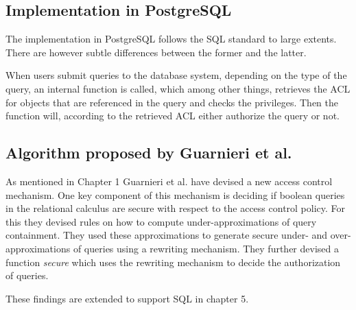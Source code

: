 \subsection{Implementation in PostgreSQL}

The implementation in PostgreSQL follows the SQL standard to large extents. 
%
There are however subtle differences between the former and the latter.
%

When users submit queries to the database system, depending on the type of the query, an internal function is called, which among other things, retrieves the ACL for objects that are referenced in the query and checks the privileges.
%
Then the function will, according to the retrieved ACL either authorize the query or not.

\subsection{Algorithm proposed by Guarnieri et al.}

As mentioned in Chapter 1 Guarnieri et al. have devised a new access control mechanism.
%
One key component of this mechanism is deciding if boolean queries in the relational calculus are secure with respect to the access control policy.
%
For this they devised rules on how to compute under-approximations of query containment.
%
They used these approximations to generate secure under- and over-approximations of queries using a rewriting mechanism.
%
They further devised a function \emph{secure} which uses the rewriting mechanism to decide the authorization of queries.




%
These findings are extended to support SQL in chapter 5.

